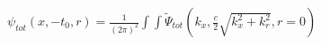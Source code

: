 $\psi_{tot}(x,-t_0,r) = \frac{1}{(2\pi)^2} \int\!\!\!\int
\tilde\Psi_{tot}\left(k_x,\frac{c}{2}\sqrt{k_x^2 + k_r^2},r=0\right)$
